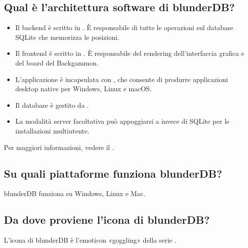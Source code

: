 \documentclass[letterpaper,10pt,italian]{sphinxmanual}
\begin{document}
\subsection{Qual è l’architettura software di blunderDB?}
\label{\detokenize{faq:quel-est-l-architecture-logicielle-de-blunderdb}}\begin{itemize}
\item {} 
\sphinxAtStartPar
Il backend è scritto in . È responsabile di tutte le operazioni sul database SQLite che memorizza le posizioni.

\item {} 
\sphinxAtStartPar
Il frontend è scritto in . È responsabile del rendering dell’interfaccia grafica e del board del Backgammon.

\item {} 
\sphinxAtStartPar
L’applicazione è incapsulata con , che consente di produrre applicazioni desktop native per Windows, Linux e macOS.

\item {} 
\sphinxAtStartPar
Il database è gestito da .

\item {} 
\sphinxAtStartPar
La modalità server facoltativa può appoggiarsi a  invece di SQLite per le installazioni multiutente.

\end{itemize}

\sphinxAtStartPar
Per maggiori informazioni, vedere il .


\subsection{Su quali piattaforme funziona blunderDB?}
\label{\detokenize{faq:sur-quelles-plateformes-blunderdb-fonctionne-t-il}}
\sphinxAtStartPar
blunderDB funziona su Windows, Linux e Mac.


\subsection{Da dove proviene l’icona di blunderDB?}
\label{\detokenize{faq:d-ou-vient-l-icone-de-blunderdb}}
\sphinxAtStartPar
L’icona di blunderDB è l’emoticon «goggling» della serie .
\end{document}
